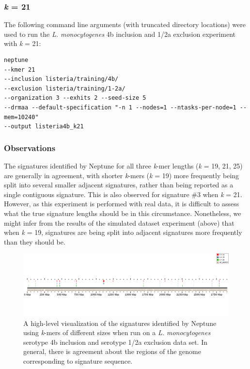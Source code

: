 \documentclass[a4paper,10pt]{article}
\begin{document}
\subsubsection*{\textit{k} = 21}

The following command line arguments (with truncated directory locations) were used to run the \textit{L. monocytogenes} 4b inclusion and 1/2a exclusion experiment with \textit{k} = 21:

\begin{verbatim}
neptune
--kmer 21
--inclusion listeria/training/4b/
--exclusion listeria/training/1-2a/
--organization 3 --exhits 2 --seed-size 5
--drmaa --default-specification "-n 1 --nodes=1 --ntasks-per-node=1 --mem=10240"
--output listeria4b_k21
\end{verbatim}

\subsubsection*{Observations}

The signatures identified by Neptune for all three \textit{k}-mer lengths (\textit{k} = 19, 21, 25) are generally in agreement, with shorter \textit{k}-mers (\textit{k} = 19) more frequently being split into several smaller adjacent signatures, rather than being reported as a single contiguous signature. This is also observed for signature \#3 when \textit{k} = 21. However, as this experiment is performed with real data, it is difficult to assess what the true signature lengths should be in this circumstance. Nonetheless, we might infer from the results of the simulated dataset experiment (above) that when \textit{k} = 19, signatures are being split into adjacent signatures more frequently than they should be.

\begin{figure}
\centering
\includegraphics[width=1.0\textwidth]{listeria4b_kmers_crop.png}
\caption{A high-level visualization of the signatures identified by Neptune using \textit{k}-mers of different sizes when run on a \textit{L. monocytogenes} serotype 4b inclusion and serotype 1/2a exclusion data set. In general, there is agreement about the regions of the genome corresponding to signature sequence.}
\label{figure:listeria4b_kmers}
\end{figure}
\end{document}
